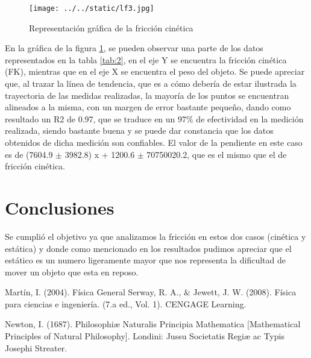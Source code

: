 \documentclass{article}
\begin{document}
\begin{figure}[H]
		\centering
		\texttt{[image: ../../static/lf3.jpg]}	
		\caption{Representación gráfica de la fricción cinética}
		\label{fig:3}
	\end{figure}

En la gráfica de la figura \ref{fig:3}, se pueden observar una parte de los datos representados en la tabla \ref{tab:2}, en el eje Y se encuentra la fricción cinética (FK), mientras que en el eje X se encuentra el peso del objeto. Se puede apreciar que, al trazar la línea de tendencia, que es a cómo debería de estar ilustrada la trayectoria de las medidas realizadas, la mayoría de los puntos se encuentran alineados a la misma, con un margen de error bastante pequeño, dando como resultado un R2 de 0.97, que se traduce en un 97$\%$ de efectividad en la medición realizada, siendo bastante buena y se puede dar constancia que los datos obtenidos de dicha medición son confiables. El valor de la pendiente en este caso es de (7604.9 $\pm$ 3982.8) x + 1200.6 $\pm$ 70750020.2, que es el mismo que el de fricción cinética.

\section{Conclusiones}\label{Conclusiones}				%
Se cumplió el objetivo ya que analizamos la fricción en estos dos casos (cinética y estática) y donde como mencionado en los resultados pudimos apreciar que el estático es un numero ligeramente mayor 
que nos representa la dificultad de mover un objeto que esta en reposo.  

\begin{thebibliography}{9}						%
		Martín, I. (2004). Física General
		Serway, R. A., $\&$ Jewett, J. W. (2008). Física para ciencias e ingeniería. (7.a
ed., Vol. 1). CENGAGE Learning.

	Newton, I. (1687). Philosophiæ Naturalis Principia Mathematica [Mathematical Principles of Natural Philosophy]. Londini: Jussu Societatis Regiæ ac Typis Josephi Streater.
\end{thebibliography}
\end{document}
